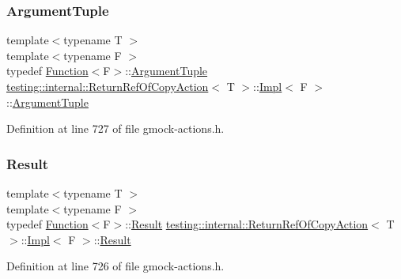 \subsubsection{\texorpdfstring{Argument\+Tuple}{ArgumentTuple}}
{\footnotesize\ttfamily template$<$typename T $>$ \\
template$<$typename F $>$ \\
typedef \hyperlink{structtesting_1_1internal_1_1Function}{Function}$<$F$>$\+::\hyperlink{classtesting_1_1ActionInterface_af72720d864da4d606629e83edc003511}{Argument\+Tuple} \hyperlink{classtesting_1_1internal_1_1ReturnRefOfCopyAction}{testing\+::internal\+::\+Return\+Ref\+Of\+Copy\+Action}$<$ T $>$\+::\hyperlink{classtesting_1_1internal_1_1ReturnRefOfCopyAction_1_1Impl}{Impl}$<$ F $>$\+::\hyperlink{classtesting_1_1ActionInterface_af72720d864da4d606629e83edc003511}{Argument\+Tuple}}



Definition at line 727 of file gmock-\/actions.\+h.

\mbox{\label{classtesting_1_1internal_1_1ReturnRefOfCopyAction_1_1Impl_abb413010cf24f603295ac6426adbe9d0}} 
\subsubsection{\texorpdfstring{Result}{Result}}
{\footnotesize\ttfamily template$<$typename T $>$ \\
template$<$typename F $>$ \\
typedef \hyperlink{structtesting_1_1internal_1_1Function}{Function}$<$F$>$\+::\hyperlink{classtesting_1_1ActionInterface_a7477de2fe3e4e01c59db698203acaee7}{Result} \hyperlink{classtesting_1_1internal_1_1ReturnRefOfCopyAction}{testing\+::internal\+::\+Return\+Ref\+Of\+Copy\+Action}$<$ T $>$\+::\hyperlink{classtesting_1_1internal_1_1ReturnRefOfCopyAction_1_1Impl}{Impl}$<$ F $>$\+::\hyperlink{classtesting_1_1ActionInterface_a7477de2fe3e4e01c59db698203acaee7}{Result}}



Definition at line 726 of file gmock-\/actions.\+h.



